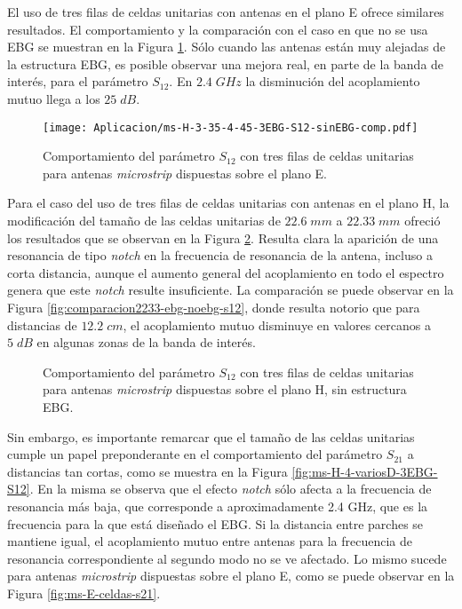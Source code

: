 El uso de tres filas de celdas unitarias con antenas en el plano E ofrece similares resultados. El comportamiento y la comparación con el caso en que no se usa EBG se muestran en la Figura \ref{fig:planoe-3ebg-comparacion}. Sólo cuando las antenas están muy alejadas de la estructura EBG, es posible observar una mejora real, en parte de la banda de interés, para el parámetro $S_{12}$. En $2.4\; GHz$ la disminución del acoplamiento mutuo llega a los $25\; dB$.

\begin{figure}[h]
	\centering
	\texttt{[image: Aplicacion/ms-H-3-35-4-45-3EBG-S12-sinEBG-comp.pdf]}
	\caption{Comportamiento del parámetro $S_{12}$ con tres filas de celdas unitarias para antenas \textit{microstrip} dispuestas sobre el plano E.}
	\label{fig:planoe-3ebg-comparacion}
\end{figure}


Para el caso del uso de tres filas de celdas unitarias con antenas en el plano H, la modificación del tamaño de las celdas unitarias de $22.6\;mm$ a $22.33 \;mm$ ofreció los resultados que se observan en la Figura \ref{fig:2233-2ebg-h}. Resulta clara la aparición de una resonancia de tipo \textit{notch} en la frecuencia de resonancia de la antena, incluso a corta distancia, aunque el aumento general del acoplamiento en todo el espectro genera que este \textit{notch} resulte insuficiente. La comparación se puede observar en la Figura \ref{fig:comparacion2233-ebg-noebg-s12}, donde resulta notorio que para distancias de $12.2 \;cm$, el acoplamiento mutuo disminuye en valores cercanos a $5\; dB$ en algunas zonas de la banda de interés.


\begin{figure}[H]
	\centering 
	\caption{Comportamiento del parámetro $S_{12}$ con tres filas de celdas unitarias para antenas \textit{microstrip} dispuestas sobre el plano H, sin estructura EBG.}
	\label{fig:2233-2ebg-h}
\end{figure}

Sin embargo, es importante remarcar que el tamaño de las celdas unitarias cumple un papel preponderante en el comportamiento del parámetro $S_{21}$ a distancias tan cortas, como se muestra en la Figura \ref{fig:ms-H-4-variosD-3EBG-S12}. En la misma se observa que el efecto \textit{notch} sólo afecta a la frecuencia de resonancia más baja, que corresponde a aproximadamente 2.4 GHz, que es la frecuencia para la que está diseñado el EBG. Si la distancia entre parches se mantiene igual, el acoplamiento mutuo entre antenas para la frecuencia de resonancia correspondiente al segundo modo no se ve afectado. Lo mismo sucede para antenas \textit{microstrip} dispuestas sobre el plano E, como se puede observar en la Figura \ref{fig:ms-E-celdas-s21}.

